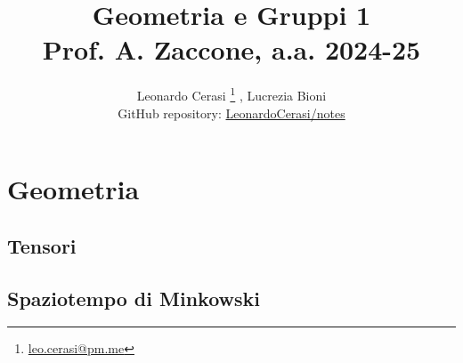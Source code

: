 \documentclass[a4paper, 12pt, openany]{book}
\author{Leonardo Cerasi%
	\thanks{\scriptsize\href{mailto:leonardo.cerasi@studenti.unimi.it}{leo.cerasi@pm.me}}%
	, Lucrezia Bioni\\
	\small GitHub repository: \href{https://github.com/LeonardoCerasi/notes}{LeonardoCerasi/notes}}
\title{\Huge\textbf{Geometria e Gruppi 1} \\ \large Prof. A. Zaccone, a.a. 2024-25}
\begin{document}
\frontmatter

\maketitle
\tableofcontents

\mainmatter

\part{Geometria}

\chapter{Tensori}


\chapter{Spaziotempo di Minkowski}

\end{document}
